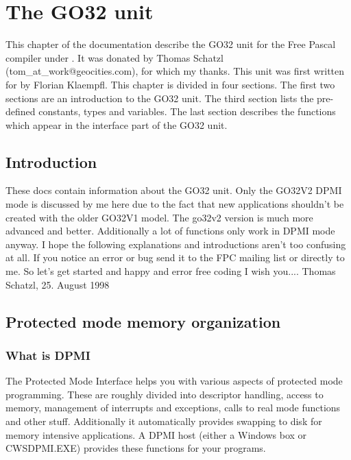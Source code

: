 \chapter{The GO32 unit}
This chapter of the documentation describe the GO32 unit for the Free Pascal
compiler under \dos. It was donated by Thomas Schatzl
(tom\_at\_work@geocities.com), for which my thanks.
This unit was first written for \dos by Florian Klaempfl.
This chapter is divided in four sections. The first two sections are an
introduction to the GO32 unit. The third section lists the pre-defined
constants, types and variables. The last section describes the functions
which appear in the interface part of the GO32 unit.
\section{Introduction}
These docs contain information about the GO32 unit. Only the GO32V2 DPMI
mode is discussed by me here due to the fact that new applications shouldn't
be created with the older GO32V1 model. The go32v2 version is much more advanced and
better. Additionally a lot of functions only work in DPMI mode anyway.
I hope the following explanations and introductions aren't too confusing at
all. If you notice an error or bug send it to the FPC mailing list or
directly to me.
So let's get started and happy and error free coding I wish you....
\hfill Thomas Schatzl, 25. August 1998
\section{Protected mode memory organization}
\subsection{What is DPMI}
The \dos Protected Mode Interface helps you with various aspects of protected
mode programming. These are roughly divided into descriptor handling, access
to \dos memory, management of interrupts and exceptions, calls to real mode
functions and other stuff. Additionally it automatically provides swapping
to disk for memory intensive applications.
A DPMI host (either a Windows \dos box or CWSDPMI.EXE) provides these
functions for your programs.
